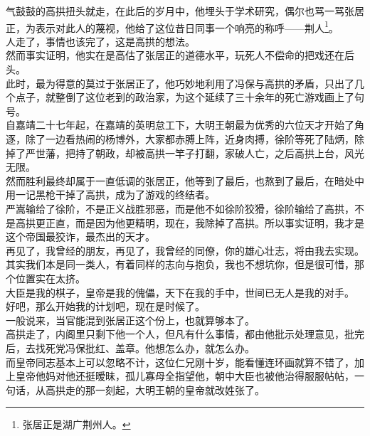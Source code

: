 \begin{multicols}{\theparacolNo}
气鼓鼓的高拱扭头就走，在此后的岁月中，他埋头于学术研究，偶尔也骂一骂张居正，为表示对此人的蔑视，他给了这位昔日同事一个响亮的称呼——荆人\footnote{张居正是湖广荆州人。}。\\

人走了，事情也该完了，这是高拱的想法。\\

然而事实证明，他实在是高估了张居正的道德水平，玩死人不偿命的把戏还在后头。\\

此时，最为得意的莫过于张居正了，他巧妙地利用了冯保与高拱的矛盾，只出了几个点子，就整倒了这位老到的政治家，为这个延续了三十余年的死亡游戏画上了句号。\\

自嘉靖二十七年起，在嘉靖的英明怠工下，大明王朝最为优秀的六位天才开始了角逐，除了一边看热闹的杨博外，大家都赤膊上阵，近身肉搏，徐阶等死了陆炳，除掉了严世藩，把持了朝政，却被高拱一竿子打翻，家破人亡，之后高拱上台，风光无限。\\

然而胜利最终却属于一直低调的张居正，他等到了最后，也熬到了最后，在暗处中用一记黑枪干掉了高拱，成为了游戏的终结者。\\

严嵩输给了徐阶，不是正义战胜邪恶，而是他不如徐阶狡猾，徐阶输给了高拱，不是高拱更正直，而是因为他更精明，现在，我除掉了高拱。所以事实证明，我才是这个帝国最狡诈，最杰出的天才。\\

再见了，我曾经的朋友，再见了，我曾经的同僚，你的雄心壮志，将由我去实现。\\

其实我们本是同一类人，有着同样的志向与抱负，我也不想坑你，但是很可惜，那个位置实在太挤。\\

大臣是我的棋子，皇帝是我的傀儡，天下在我的手中，世间已无人是我的对手。\\

好吧，那么开始我的计划吧，现在是时候了。\\

一般说来，当官能混到张居正这个份上，也就算够本了。\\

高拱走了，内阁里只剩下他一个人，但凡有什么事情，都由他批示处理意见，批完后，去找死党冯保批红、盖章。他想怎么办，就怎么办。\\

而皇帝同志基本上可以忽略不计，这位仁兄刚十岁，能看懂连环画就算不错了，加上皇帝他妈对他还挺暧昧，孤儿寡母全指望他，朝中大臣也被他治得服服帖帖，一句话，从高拱走的那一刻起，大明王朝的皇帝就改姓张了。\\


\end{multicols}
